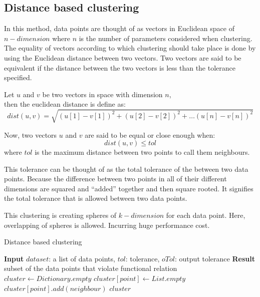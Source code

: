 \subsection{Distance based clustering}

In this method, data points are thought of as vectors in Euclidean space of \(n-dimension\) where \(n\) is the number of parameters considered when clustering. The equality of vectors according to which clustering should take place is done by using the Euclidean distance between two vectors. Two vectors are said to be equivalent if the distance between the two vectors is less than the tolerance specified.

Let \(u\) and \(v\) be two vectors in space with dimension \(n\),\\
then the euclidean distance is define as: \\
\[dist(u, v) = \sqrt{(u[1] - v[1])^2 + (u[2] - v[2])^2 + \ldots (u[n] - v[n])^2}\]

Now, two vectors \(u\) and \(v\) are said to be equal or close enough when:\\
\[dist(u,v) \leq tol\]  where \(tol\) is the maximum distance between two points to call them neighbours.

This tolerance can be thought of as the total tolerance of the between two data points. Because the difference between two points in all of their different dimensions are squared and ``added'' together and then square rooted. It signifies the total tolerance that is allowed between two data points. 

This clustering is creating spheres of \(k-dimension\) for each data point. Here, overlapping of spheres is allowed. Incurring huge performance cost.

\begin{algorithm}
    \caption{Distance based clustering}\label{alg:dbscanExistence}
    \begin{algorithmic}[1]
        \State \textbf{Input} $dataset$: a list of data points, $tol$: tolerance, $oTol$: output tolerance
        \State \textbf{Result} subset of the data points that violate functional relation
        \State $cluster \gets Dictionary.empty$
         
        \State $cluster[point] \gets List.empty$     
         
        \State $cluster[point].add(neighbour)$
        \EndIf
        \EndFor
        \EndFor
        \State\Return $cluster$
        \EndProcedure
    \end{algorithmic}
\end{algorithm}


